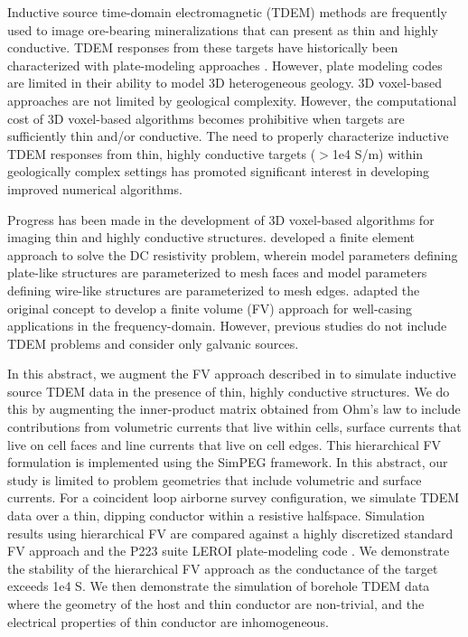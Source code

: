 \documentclass{segabs}
\begin{document}
Inductive source time-domain electromagnetic (TDEM) methods are frequently used to image ore-bearing mineralizations that can present as thin and highly conductive. TDEM responses from these targets have historically been characterized with plate-modeling approaches \citep{HannesonWest1984,WalkerLamontagne2006}. However, plate modeling codes are limited in their ability to model 3D heterogeneous geology. 3D voxel-based approaches are not limited by geological complexity. However, the computational cost of 3D voxel-based algorithms becomes prohibitive when targets are sufficiently thin and/or conductive. The need to properly characterize inductive TDEM responses from thin, highly conductive targets ($>$1e4 S/m) within geologically complex settings has promoted significant interest in developing improved numerical algorithms.

Progress has been made in the development of 3D voxel-based algorithms for imaging thin and highly conductive structures. \citeyear{Weiss2017} developed a finite element approach to solve the DC resistivity problem, wherein model parameters defining plate-like structures are parameterized to mesh faces and model parameters defining wire-like structures are parameterized to mesh edges. \citeyear{Hu2022} adapted the original concept to develop a finite volume (FV) approach for well-casing applications in the frequency-domain. However, previous studies do not include TDEM problems and consider only galvanic sources.

In this abstract, we augment the FV approach described in \citep{Haber2014} to simulate inductive source TDEM data in the presence of thin, highly conductive structures. We do this by augmenting the inner-product matrix obtained from Ohm's law to include contributions from volumetric currents that live within cells, surface currents that live on cell faces and line currents that live on cell edges. This hierarchical FV formulation is implemented using the SimPEG \citep{Cockett2015} framework. In this abstract, our study is limited to problem geometries that include volumetric and surface currents. For a coincident loop airborne survey configuration, we simulate TDEM data over a thin, dipping conductor within a resistive halfspace.  Simulation results using hierarchical FV are compared against a highly discretized standard FV approach and the P223 suite LEROI plate-modeling code \citep{Raiche2007}. We demonstrate the stability of the hierarchical FV approach as the conductance of the target exceeds 1e4 S. We then demonstrate the simulation of borehole TDEM data where the geometry of the host and thin conductor are non-trivial, and the electrical properties of thin conductor are inhomogeneous.
\end{document}
